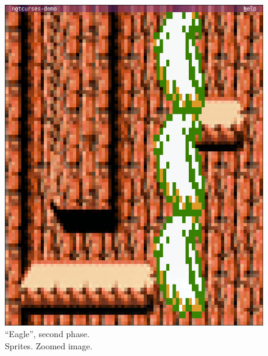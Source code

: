 \documentclass[letterpaper,10pt]{article}
\begin{document}
\begin{figure}
\begin{minipage}{0.45\textwidth}
    \includegraphics[width=1\linewidth]{media/demoeagle1.png}
    \caption{``Eagle'', second phase.\\
      Sprites. Zoomed image.}
  \end{minipage}
\end{figure}
\end{document}
